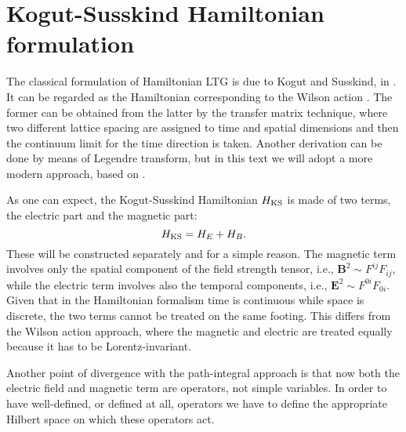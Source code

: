 \section{Kogut-Susskind Hamiltonian formulation}
\label{sec:kogut_susskind_hamiltonian_formulation}

The classical formulation of Hamiltonian LTG is due to Kogut and Susskind, in \citneeded.
It can be regarded as the Hamiltonian corresponding to the Wilson action .
The former can be obtained from the latter by the transfer matrix technique\citneeded, where two different lattice spacing are assigned to time and spatial dimensions and then the continuum limit for the time direction is taken.
Another derivation can be done by means of Legendre transform, but in this text we will adopt a more modern approach, based on .

As one can expect, the Kogut-Susskind Hamiltonian $H_{\text{KS}}$ is made of two terms, the electric part and the magnetic part:
\begin{equation}
    H_{\text{KS}} = H_E + H_B.
\end{equation}
These will be constructed separately and for a simple reason.
The magnetic term involves only the spatial component of the field strength tensor, i.e., $\bm{B}^{2} \sim F^{ij}F_{ij}$, while the electric term involves also the temporal components, i.e., $\bm{E}^2 \sim F^{0i} F_{0i}$.
Given that in the Hamiltonian formalism time is continuous while space is discrete, the two terms cannot be treated on the same footing.
This differs from the Wilson action approach, where the magnetic and electric are treated equally because it has to be Lorentz-invariant.


Another point of divergence with the path-integral approach is that now both the electric field and magnetic term are operators, not simple variables.
In order to have well-defined, or defined at all, operators we have to define the appropriate Hilbert space on which these operators act.


